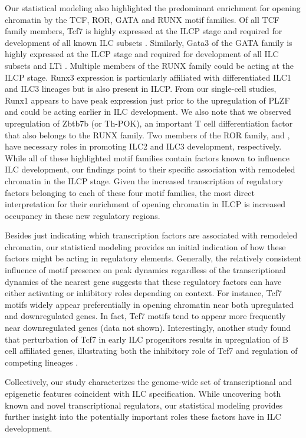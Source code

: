 Our statistical modeling also highlighted the predominant enrichment for opening chromatin by the TCF, ROR, GATA and RUNX motif families. Of all TCF family members, Tcf7 is highly expressed at the ILCP stage and required for development of all known ILC subsets \cite{yang2015,mielke2013,yang2013}. Similarly, Gata3 of the GATA family is highly expressed at the ILCP stage and required for development of all ILC subsets and LTi \cite{yagi2014}. Multiple members of the RUNX family could be acting at the ILCP stage. Runx3 expression is particularly affiliated with differentiated ILC1 and ILC3 lineages but is also present in ILCP. From our single-cell studies, Runx1 appears to have peak expression just prior to the upregulation of PLZF and could be acting earlier in ILC development. We also note that we observed upregulation of Zbtb7b (or Th-POK), an important T cell differentiation factor that also belongs to the RUNX family. Two members of the ROR family, \RORa{} and \RORgt, have necessary roles in promoting ILC2 and ILC3 development, respectively. While all of these highlighted motif families contain factors known to influence ILC development, our findings point to their specific association with remodeled chromatin in the ILCP stage. Given the increased transcription of regulatory factors belonging to each of these four motif families, the most direct interpretation for their enrichment of opening chromatin in ILCP is increased occupancy in these new regulatory regions.

Besides just indicating which transcription factors are associated with remodeled chromatin, our statistical modeling provides an initial indication of how these factors might be acting in regulatory elements. Generally, the relatively consistent influence of motif presence on peak dynamics regardless of the transcriptional dynamics of the nearest gene suggests that these regulatory factors can have either activating or inhibitory roles depending on context. For instance, Tcf7 motifs widely appear preferentially in opening chromatin near both upregulated and downregulated genes. In fact, Tcf7 motifs tend to appear more frequently near downregulated genes (data not shown). Interestingly, another study found that perturbation of Tcf7 in early ILC progenitors results in upregulation of B cell affiliated genes, illustrating both the inhibitory role of Tcf7 and regulation of competing lineages \cite{seillet2016}. 

Collectively, our study characterizes the genome-wide set of transcriptional and epigenetic features coincident with ILC specification. While uncovering both known and novel transcriptional regulators, our statistical modeling provides further insight into the potentially important roles these factors have in ILC development. 

